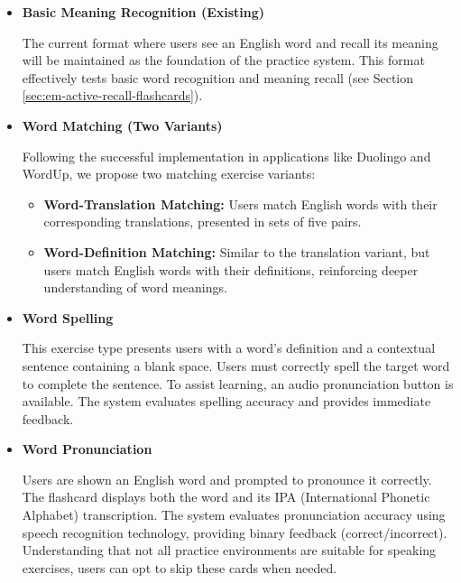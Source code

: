 \begin{itemize}
    \item \textbf{Basic Meaning Recognition (Existing)}

    The current format where users see an English word and recall its meaning will be maintained as the foundation of the practice system. This format effectively tests basic word recognition and meaning recall (see Section \ref{sec:em-active-recall-flashcards}).

    \item \textbf{Word Matching (Two Variants)}
    
    Following the successful implementation in applications like Duolingo and WordUp, we propose two matching exercise variants:
    
    \begin{itemize}
        \item \textbf{Word-Translation Matching:} Users match English words with their corresponding translations, presented in sets of five pairs.
        
        \item \textbf{Word-Definition Matching:} Similar to the translation variant, but users match English words with their definitions, reinforcing deeper understanding of word meanings.
    \end{itemize}

    \item \textbf{Word Spelling}
    
    This exercise type presents users with a word's definition and a contextual sentence containing a blank space. Users must correctly spell the target word to complete the sentence. To assist learning, an audio pronunciation button is available. The system evaluates spelling accuracy and provides immediate feedback.
    \newpage

    \item \textbf{Word Pronunciation}

    Users are shown an English word and prompted to pronounce it correctly. The flashcard displays both the word and its IPA (International Phonetic Alphabet) transcription. The system evaluates pronunciation accuracy using speech recognition technology, providing binary feedback (correct/incorrect). Understanding that not all practice environments are suitable for speaking exercises, users can opt to skip these cards when needed.

\end{itemize}

